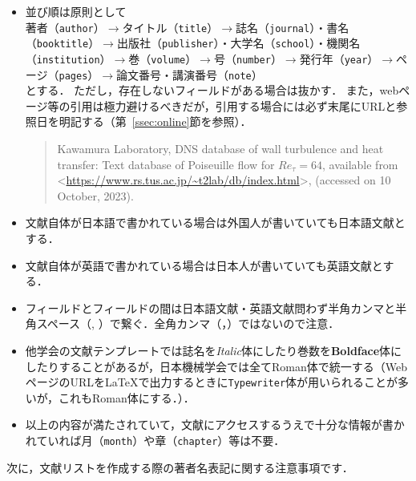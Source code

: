 \documentclass[a4paper,fleqn,uplatex,dvipdfmx]{jsarticle}
\begin{document}
\begin{itembox}[l]{}
    \begin{itemize}
        \item 並び順は原則として \\
            著者（\verb|author|）$\to$タイトル（\verb|title|）$\to$誌名（\verb|journal|）・書名（\verb|booktitle|）$\to$出版社（\verb|publisher|）・大学名（\verb|school|）・機関名（\verb|institution|）$\to$巻（\verb|volume|）$\to$号（\verb|number|）$\to$発行年（\verb|year|）$\to$ページ（\verb|pages|）$\to$論文番号・講演番号（\verb|note|） \\
            とする．
            ただし，存在しないフィールドがある場合は抜かす．
            また，webページ等の引用は極力避けるべきだが，引用する場合には必ず末尾にURLと参照日を明記する（第~\ref{ssec:online}節\ttonline を参照）．
            \begin{quote}
                Kawamura Laboratory, DNS database of wall turbulence and heat transfer: Text database of Poiseuille flow for $\mathit{Re}_\tau = 64$, available from \textless\url{https://www.rs.tus.ac.jp/~t2lab/db/index.html}\textgreater, (accessed on 10 October, 2023).
            \end{quote}
        \item 文献自体が日本語で書かれている場合は外国人が書いていても日本語文献とする．
        \item 文献自体が英語で書かれている場合は日本人が書いていても英語文献とする．
        \item フィールドとフィールドの間は日本語文献・英語文献問わず半角カンマと半角スペース（, ）で繋ぐ．全角カンマ（，）ではないので注意．
        \item 他学会の文献テンプレートでは誌名を\textit{Italic}体にしたり巻数を\textbf{Boldface}体にしたりすることがあるが，日本機械学会では全て\textrm{Roman}体で統一する（WebページのURLを\LaTeX{}で出力するときに\texttt{Typewriter}体が用いられることが多いが，これも\textrm{Roman}体にする．）．
        \item 以上の内容が満たされていて，文献にアクセスするうえで十分な情報が書かれていれば月（\verb|month|）や章（\verb|chapter|）等は不要．
    \end{itemize}
\end{itembox}
\renewcommand\UrlFont{\ttfamily}
次に，文献リストを作成する際の著者名表記に関する注意事項です．
\end{document}
